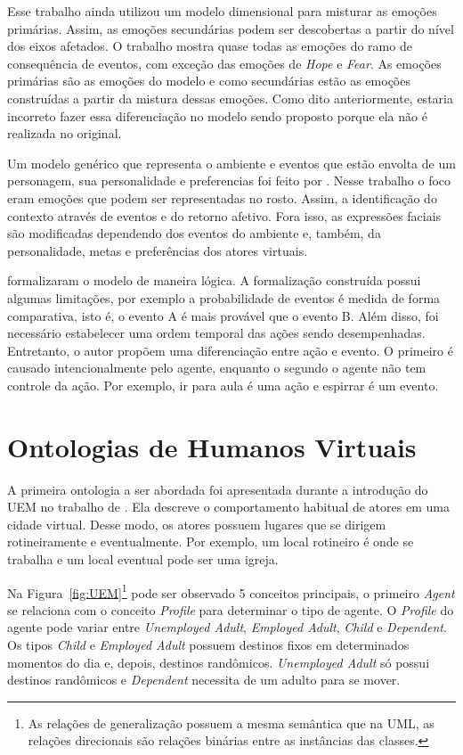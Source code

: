 Esse trabalho ainda utilizou um modelo dimensional para misturar as emoções
primárias. Assim, as emoções secundárias podem ser descobertas a partir do
nível dos eixos afetados. O trabalho mostra quase todas as emoções do
ramo de consequência de eventos, com exceção das emoções de \emph{Hope} e
\emph{Fear}. As emoções primárias são as emoções do modelo \occ e como
secundárias estão as emoções construídas a partir da mistura dessas emoções.
Como dito anteriormente, estaria incorreto fazer essa diferenciação no modelo
sendo proposto porque ela não é realizada no original.

Um modelo genérico que representa o ambiente e eventos que estão envolta de um
personagem, sua personalidade e preferencias foi feito por
\citet{lera2009semantic}. Nesse trabalho o foco eram emoções que podem ser
representadas no rosto. Assim, a identificação do contexto através de eventos
e do retorno afetivo. Fora isso, as expressões faciais são modificadas
dependendo dos eventos do ambiente e, também, da personalidade, metas e
preferências dos atores virtuais.

\citet{adam2009alfototoe} formalizaram o modelo \occ de maneira lógica. A
formalização construída possui algumas limitações, por exemplo a probabilidade
de eventos é medida de forma comparativa, isto é, o evento A é mais provável
que o evento B. Além disso, foi necessário estabelecer uma ordem temporal
das ações sendo desempenhadas.  Entretanto, o autor propõem uma diferenciação
entre ação e evento. O primeiro é causado intencionalmente pelo agente\dev{},
enquanto o segundo o agente não tem controle da ação. Por exemplo, ir para
aula é uma ação e espirrar é um evento.

\section{Ontologias de Humanos Virtuais} \label{cap:eda:odhv}

A primeira ontologia a ser abordada foi apresentada durante a introdução do
UEM no trabalho de \citet{paiva2005ontology}. Ela descreve o comportamento
habitual de atores em uma cidade virtual. Desse modo, os atores possuem
lugares que se dirigem rotineiramente e eventualmente. Por exemplo, um local
rotineiro é onde se trabalha e um local eventual pode ser uma igreja.

Na Figura~\ref{fig:UEM}\footnote{As relações de generalização possuem a mesma
semântica que na UML, as relações direcionais são relações binárias entre as
instâncias das classes.} pode ser observado 5 conceitos principais, o primeiro
\emph{Agent} se relaciona com o conceito \emph{Profile} para determinar o tipo
de agente. O \emph{Profile} do agente pode variar entre \emph{Unemployed Adult},
\emph{Employed Adult}, \emph{Child} e \emph{Dependent}. \label{ex:tipos}Os tipos \emph{Child}
e \emph{Employed Adult} possuem destinos fixos em determinados momentos do dia
e, depois, destinos randômicos. \emph{Unemployed Adult} só possui destinos
randômicos e \emph{Dependent} necessita de um adulto para se mover.

